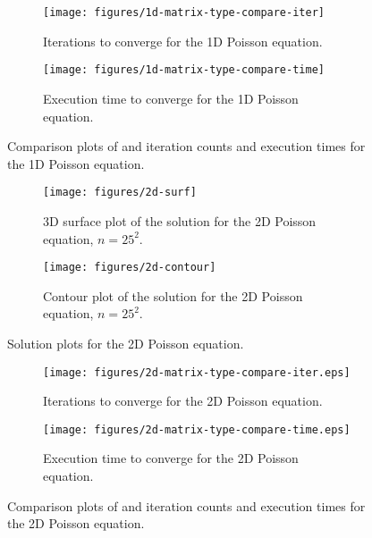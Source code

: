 \begin{figure}[ht!]
\begin{subfigure}{\textwidth}
	\centering
    \texttt{[image: figures/1d-matrix-type-compare-iter]}
    \caption{Iterations to converge for the 1D Poisson equation.}
\end{subfigure}
\par\bigskip
\begin{subfigure}{\textwidth}
	\centering
    \texttt{[image: figures/1d-matrix-type-compare-time]}
    \caption{Execution time to converge for the 1D Poisson equation.}
\end{subfigure}
\caption{Comparison plots of  and  iteration counts and execution times for the 1D Poisson equation.}
\label{fig:1d-matrix-compare}
\end{figure}


\begin{figure}[ht!]
\begin{subfigure}{\textwidth}
  \centering
  \texttt{[image: figures/2d-surf]}
  \caption{3D surface plot of the solution for the 2D Poisson equation, $n=25^2$.}
  \label{fig:2d-matrix-solution-surface}
\end{subfigure}
\par\bigskip
\begin{subfigure}{\textwidth}
  \centering
  \texttt{[image: figures/2d-contour]}
  \caption{Contour plot of the solution for the 2D Poisson equation, $n=25^2$.}
  \label{fig:2d-matrix-solution-contour}
\end{subfigure}
\caption{Solution plots for the 2D Poisson equation.}
\end{figure}

\begin{figure}[ht!]
\begin{subfigure}{\textwidth}
	\centering
    \texttt{[image: figures/2d-matrix-type-compare-iter.eps]}
    \caption{Iterations to converge for the 2D Poisson equation.}
    \label{fig:2d-matrix-type-compare-iter}
\end{subfigure}
\par\bigskip
\begin{subfigure}{\textwidth}
	\centering
    \texttt{[image: figures/2d-matrix-type-compare-time.eps]}
    \caption{Execution time to converge for the 2D Poisson equation.}
    \label{fig:2d-matrix-type-compare-time}
\end{subfigure}
\caption{Comparison plots of  and  iteration counts and execution times for the 2D Poisson equation.}
\label{fig:2d-matrix-compare}
\end{figure}


